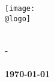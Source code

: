 \makeatletter
\thispagestyle{empty}
\begin{center}
  \texttt{[image: \\@logo]}\\[0.5cm]
  \Large{\@title} \\[1.5cm]
\end{center}
\begin{center}
  \textbf{\@coursename - \@coursetitle}\\[1cm]
  \textbf{\@author} \\[1cm]
  \textbf{\today} \\[3cm]
\end{center}

\begin{center}
  \vfill
  \@containspages\\[0.5cm]
  \textbf{\@institute}
\end{center}
\rhead{\@author}
\lhead{\@coursename - \@title}
\rfoot{\@containspages}
\clearpage
\makeatother
